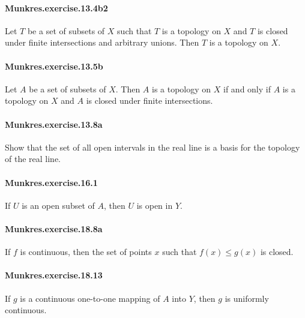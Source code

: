 \documentclass{article}
\begin{document}
\paragraph{Munkres.exercise.13.4b2} Let $T$ be a set of subsets of $X$ such that $T$ is a topology on $X$ and $T$ is closed under finite intersections and arbitrary unions. Then $T$ is a topology on $X$.

\paragraph{Munkres.exercise.13.5b} Let $A$ be a set of subsets of $X$. Then $A$ is a topology on $X$ if and only if $A$ is a topology on $X$ and $A$ is closed under finite intersections.

\paragraph{Munkres.exercise.13.8a} Show that the set of all open intervals in the real line is a basis for the topology of the real line.

\paragraph{Munkres.exercise.16.1} If $U$ is an open subset of $A$, then $U$ is open in $Y$.


\paragraph{Munkres.exercise.18.8a} If $f$ is continuous, then the set of points $x$ such that $f(x) \leq g(x)$ is closed.

\paragraph{Munkres.exercise.18.13} If $g$ is a continuous one-to-one mapping of $A$ into $Y$, then $g$ is uniformly continuous.

\end{document}
